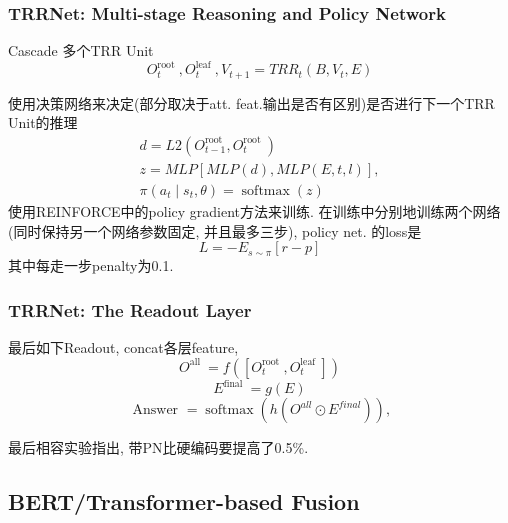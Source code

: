 \documentclass{beamer}
\begin{document}
\begin{frame}
    \frametitle{TRRNet: Multi-stage Reasoning and Policy Network}

    Cascade 多个TRR Unit
    \begin{equation}
        O_{t}^{\text {root }}, O_{t}^{\text {leaf }}, V_{t+1}=T R R_{t}\left(B, V_{t}, E\right)
    \end{equation}

    使用决策网络来决定(部分取决于att. feat.输出是否有区别)是否进行下一个TRR Unit的推理
    \begin{equation}
        \begin{array}{c}
        d=L 2\left(O_{t-1}^{\text {root }}, O_{t}^{\text {root }}\right) \\
        z=M L P[M L P(d), M L P(E, t, l)], \\
        \pi\left(a_{t} \mid s_{t}, \theta\right)=\operatorname{softmax}(z)
        \end{array}
    \end{equation}
    使用REINFORCE中的policy gradient方法来训练. 在训练中分别地训练两个网络(同时保持另一个网络参数固定, 并且最多三步), policy net. 的loss是
    \begin{equation}
        L=-E_{s \sim \pi}[r-p]
    \end{equation}
    其中每走一步penalty为0.1.


\end{frame}


\begin{frame}
    \frametitle{TRRNet: The Readout Layer}
    
    最后如下Readout, concat各层feature, 
    \begin{equation}
        O^{\text {all }}=f\left(\left[O_{t}^{\text {root }}, O_{t}^{\text {leaf }}\right]\right)
    \end{equation}
    \begin{equation}
        E^{\text {final }}=g(E)
    \end{equation}
    \begin{equation}
        \text { Answer }=\operatorname{softmax}\left(h\left(O^{a l l} \odot E^{f i n a l}\right)\right),
    \end{equation}

    最后相容实验指出, 带PN比硬编码要提高了0.5\%.

\end{frame}

\subsection{BERT/Transformer-based Fusion}
\end{document}
